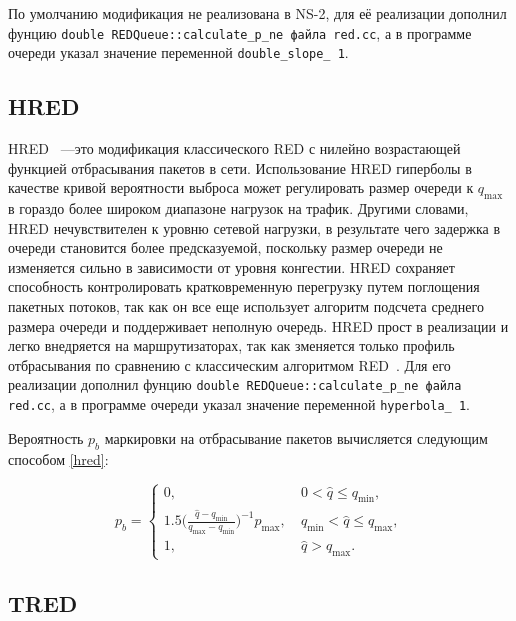По умолчанию модификация не реализована в NS-2, для её реализации дополнил фунцию \verb|double REDQueue::calculate_p_ne файла red.cc|, а в программе очереди указал значение переменной \verb|double_slope_ 1|. 


\subsection{HRED}

HRED ~---это модификация классического RED с нилейно возрастающей функцией отбрасывания пакетов в сети.
Использование HRED гиперболы в качестве кривой вероятности выброса может регулировать размер очереди к $q_{\max}$ в гораздо более широком диапазоне нагрузок на трафик. Другими словами, HRED нечувствителен к уровню сетевой нагрузки, в результате чего задержка в очереди становится более предсказуемой, поскольку размер очереди не изменяется сильно в зависимости от уровня конгестии.
HRED сохраняет способность контролировать кратковременную перегрузку путем поглощения пакетных потоков, так как он все еще использует алгоритм подсчета среднего размера очереди и поддерживает неполную очередь. HRED прост в реализации и легко внедряется на маршрутизаторах, так как зменяется только профиль отбрасывания по сравнению с классическим алгоритмом RED~\cite{HRED}. Для его реализации дополнил фунцию \verb|double REDQueue::calculate_p_ne файла red.cc|, а в программе очереди указал значение переменной \verb|hyperbola_ 1|.
 
Вероятность $p_{b}$ маркировки на
отбрасывание пакетов вычисляется следующим способом \eqref{hred}:

\begin{equation}
\label{hred}
p_{b} = \begin{cases}
        0, &  \ 0 < \hat{q} \leqslant q_{\min},
        \\
        1.5({\frac{\hat{q} - q_{\min}}{q_{\max} - q_{\min}})^{-1}} {p_{\max}}, & \ q_{\min} < \hat{q} \leqslant q_{\max},
        \\
        1, &  \ \hat{q} > q_{\max}.
\end{cases}
\end{equation}


\subsection{TRED}

